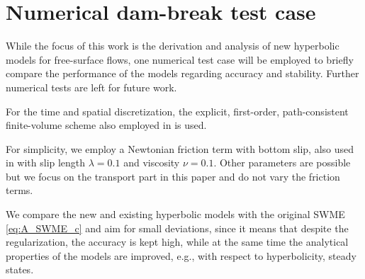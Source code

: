 \documentclass[a4paper, 11pt]{article}
\begin{document}
\section{Numerical dam-break test case}
\label{sec:numerics}
While the focus of this work is the derivation and analysis of new hyperbolic models for free-surface flows, one numerical test case will be employed to briefly compare the performance of the models regarding accuracy and stability. Further numerical tests are left for future work.

For the time and spatial discretization, the explicit, first-order, path-consistent finite-volume scheme also employed in \cite{Koellermeier2020c} is used.

For simplicity, we employ a Newtonian friction term with bottom slip, also used in \cite{Kowalski2019,Koellermeier2020c} with slip length $\lambda = 0.1$ and viscosity $\nu = 0.1$. Other parameters are possible but we focus on the transport part in this paper and do not vary the friction terms.

We compare the new and existing hyperbolic models with the original SWME \eqref{eq:A_SWME_c} and aim for small deviations, since it means that despite the regularization, the accuracy is kept high, while at the same time the analytical properties of the models are improved, e.g., with respect to hyperbolicity, steady states.
\end{document}
